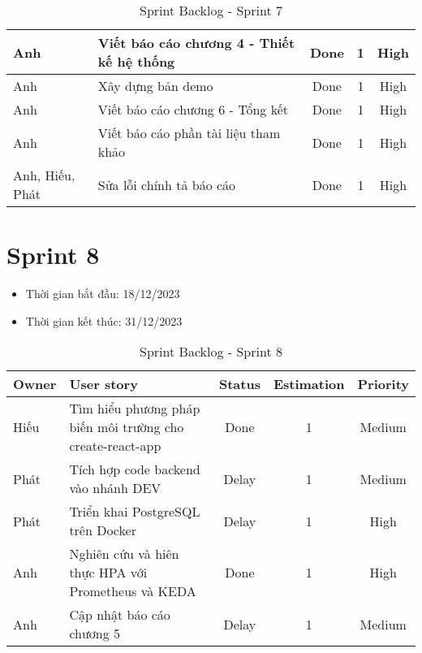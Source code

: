 \begin{table}[H]
\begin{tabular}{|m{2.5cm}|m{6cm}|c|c|c|}
    Anh               & Viết báo cáo chương 4 - Thiết kế hệ thống                    & Done            & 1                   & High         \\ \hline
    Anh                & Xây dựng bản demo                     & Done            & 1                   & High         \\ \hline
    Anh               & Viết báo cáo chương 6 - Tổng kết                     & Done            & 1                   & High         \\ \hline
    Anh               & Viết báo cáo phần tài liệu tham khảo                    & Done            & 1                   & High         \\ \hline
    Anh, Hiếu, Phát                & Sửa lỗi chính tả báo cáo                     & Done            & 1                   & High         \\ \hline
    \end{tabular}
    \caption{Sprint Backlog - Sprint 7}
    \label{tab:sprint-7}
\end{table}
\section{Sprint 8}
\begin{itemize}
    \item Thời gian bắt đầu: 18/12/2023
    \item Thời gian kết thúc: 31/12/2023
\end{itemize}
\begin{table}[H]
    \begin{tabular}{|m{2.5cm}|m{6cm}|c|c|c|}
    \hline
    \textbf{Owner}  & \textbf{User story}                                & \textbf{Status} & \textbf{Estimation} & \textbf{Priority} \\ \hline
    Hiếu               & Tìm hiểu phương pháp biến môi trường cho create-react-app                     & Done            & 1                   & Medium         \\ \hline
    Phát              & Tích hợp code backend vào nhánh DEV                     & Delay            & 1                   & Medium         \\ \hline
    Phát                & Triển khai PostgreSQL trên Docker                   & Delay            & 1                   & High         \\ \hline
    Anh               & Nghiên cứu và hiên thực HPA với Prometheus và KEDA                    & Done            & 1                   & High         \\ \hline
    Anh                & Cập nhật báo cáo chương 5                    & Delay            & 1                   & Medium         \\ \hline
    \end{tabular}
    \caption{Sprint Backlog - Sprint 8}
    \label{tab:sprint-8}
\end{table}
